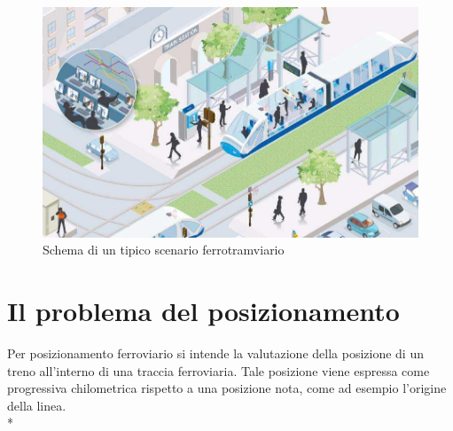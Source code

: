 \begin{figure}[h]
		\centering
		\includegraphics[width=0.7\linewidth]{img/twschema}
		\caption{Schema di un tipico scenario ferrotramviario}
		\label{fig:tramschema}
\end{figure}
\section{Il problema del posizionamento}
Per posizionamento ferroviario si intende la valutazione della posizione di un treno all'interno di una traccia ferroviaria. Tale posizione viene espressa come progressiva chilometrica rispetto a una posizione nota, come ad esempio l'origine della linea. \cite{trainpositioning}\\*
